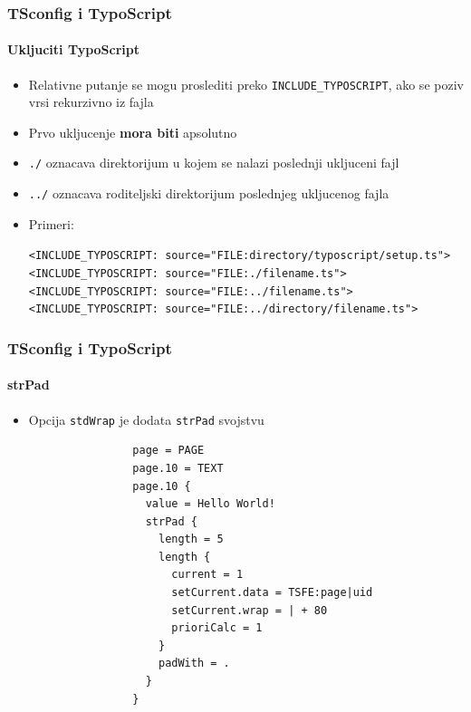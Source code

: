 
\begin{frame}[fragile]
	\frametitle{TSconfig i TypoScript}
	\framesubtitle{Ukljuciti TypoScript}

	\begin{itemize}
		\item Relativne putanje se mogu proslediti preko \texttt{INCLUDE\_TYPOSCRIPT},\newline
			ako se poziv vrsi rekurzivno iz fajla
		\item Prvo ukljucenje \textbf{mora biti} apsolutno
		\item \texttt{./} oznacava direktorijum u kojem se nalazi poslednji ukljuceni fajl
		\item \texttt{../} oznacava roditeljski direktorijum poslednjeg ukljucenog fajla
		\item Primeri:

			\lstinline!<INCLUDE_TYPOSCRIPT: source="FILE:directory/typoscript/setup.ts">!
			\lstinline!<INCLUDE_TYPOSCRIPT: source="FILE:./filename.ts">!
			\lstinline!<INCLUDE_TYPOSCRIPT: source="FILE:../filename.ts">!
			\lstinline!<INCLUDE_TYPOSCRIPT: source="FILE:../directory/filename.ts">!

	\end{itemize}

\end{frame}


\begin{frame}[fragile]
	\frametitle{TSconfig i TypoScript}
	\framesubtitle{strPad}

	\begin{itemize}
		\item Opcija \texttt{stdWrap} je dodata \texttt{strPad} svojstvu

			\begin{lstlisting}
				page = PAGE
				page.10 = TEXT
				page.10 {
				  value = Hello World!
				  strPad {
				    length = 5
				    length {
				      current = 1
				      setCurrent.data = TSFE:page|uid
				      setCurrent.wrap = | + 80
				      prioriCalc = 1
				    }
				    padWith = .
				  }
				}
			\end{lstlisting}

	\end{itemize}

\end{frame}

